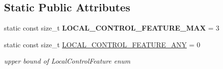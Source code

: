 \subsection*{Static Public Attributes}
\begin{DoxyCompactItemize}
\item 
static const size\+\_\+t {\bfseries L\+O\+C\+A\+L\+\_\+\+C\+O\+N\+T\+R\+O\+L\+\_\+\+F\+E\+A\+T\+U\+R\+E\+\_\+\+M\+AX} = 3\hypertarget{classnfd_1_1LocalFace_a630b5d0b72b57ea34477998e8efb6f88}{}\label{classnfd_1_1LocalFace_a630b5d0b72b57ea34477998e8efb6f88}

\item 
static const size\+\_\+t \hyperlink{classnfd_1_1LocalFace_a78fab86393e810e5f93337881b710515}{L\+O\+C\+A\+L\+\_\+\+C\+O\+N\+T\+R\+O\+L\+\_\+\+F\+E\+A\+T\+U\+R\+E\+\_\+\+A\+NY} = 0\hypertarget{classnfd_1_1LocalFace_a78fab86393e810e5f93337881b710515}{}\label{classnfd_1_1LocalFace_a78fab86393e810e5f93337881b710515}

\begin{DoxyCompactList}\small\item\em upper bound of Local\+Control\+Feature enum \end{DoxyCompactList}\end{DoxyCompactItemize}
